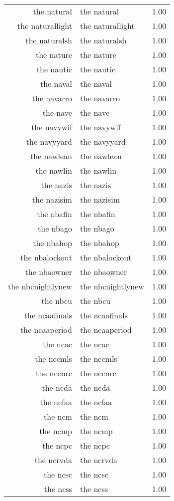 \begin{table}[ht]
\begin{tabular}{rlr}
  the natural & the natural & 1.00 \\ 
  the naturallight & the naturallight & 1.00 \\ 
  the naturalsh & the naturalsh & 1.00 \\ 
  the nature & the nature & 1.00 \\ 
  the nautic & the nautic & 1.00 \\ 
  the naval & the naval & 1.00 \\ 
  the navarro & the navarro & 1.00 \\ 
  the nave & the nave & 1.00 \\ 
  the navywif & the navywif & 1.00 \\ 
  the navyyard & the navyyard & 1.00 \\ 
  the nawlean & the nawlean & 1.00 \\ 
  the nawlin & the nawlin & 1.00 \\ 
  the nazis & the nazis & 1.00 \\ 
  the nazisim & the nazisim & 1.00 \\ 
  the nbafin & the nbafin & 1.00 \\ 
  the nbago & the nbago & 1.00 \\ 
  the nbahop & the nbahop & 1.00 \\ 
  the nbalockout & the nbalockout & 1.00 \\ 
  the nbaowner & the nbaowner & 1.00 \\ 
  the nbcnightlynew & the nbcnightlynew & 1.00 \\ 
  the nbcu & the nbcu & 1.00 \\ 
  the ncaafinals & the ncaafinals & 1.00 \\ 
  the ncaaperiod & the ncaaperiod & 1.00 \\ 
  the ncac & the ncac & 1.00 \\ 
  the nccmls & the nccmls & 1.00 \\ 
  the nccnrc & the nccnrc & 1.00 \\ 
  the ncda & the ncda & 1.00 \\ 
  the ncfaa & the ncfaa & 1.00 \\ 
  the ncm & the ncm & 1.00 \\ 
  the ncmp & the ncmp & 1.00 \\ 
  the ncpc & the ncpc & 1.00 \\ 
  the ncrvda & the ncrvda & 1.00 \\ 
  the ncsc & the ncsc & 1.00 \\ 
  the ncss & the ncss & 1.00 \\ 

\end{tabular}
\end{table}
